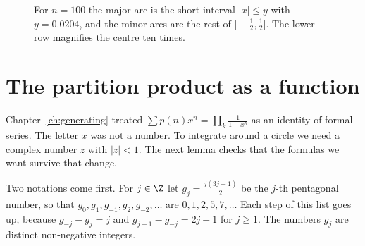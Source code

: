 \begin{figure}[ht]
\centering
{}
\caption{For $n=100$ the major arc is the short interval $|x|\le y$ with $y=0.0204$, and the minor arcs are the rest of $\bigl[-\frac12,\frac12\bigr]$. The lower row magnifies the centre ten times.}
\label{fig:rw12-farey}
\end{figure}

\section{The partition product as a function}

Chapter~\ref{ch:generating} treated $\sum p(n)x^n=\prod_k\frac1{1-x^k}$ as an identity of formal series. The letter $x$ was not a number. To integrate around a circle we need a complex number $z$ with $|z|<1$. The next lemma checks that the formulas we want survive that change.

Two notations come first. For $j\in\Z$ let $g_j=\frac{j(3j-1)}2$ be the $j$-th pentagonal number, so that $g_0,g_1,g_{-1},g_2,g_{-2},\dots$ are $0,1,2,5,7,\dots$ Each step of this list goes up, because $g_{-j}-g_j=j$ and $g_{j+1}-g_{-j}=2j+1$ for $j\ge1$. The numbers $g_j$ are distinct non-negative integers.

